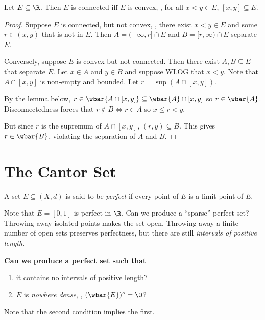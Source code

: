 \begin{theorem}
    Let $E \subseteq \R$.
    Then $E$ is connected iff $E$ is convex, \ie, for all $x < y \in E$,
    $[x, y] \subseteq E$.
\end{theorem}
\begin{proof}
    Suppose $E$ is connected, but not convex, \ie, there exist $x < y \in E$
    and some $r \in (x, y)$ that is not in $E$.
    Then $A = (-\infty, r] \cap E$ and $B = [r, \infty) \cap E$ separate
    $E$.

    Conversely, suppose $E$ is convex but not connected.
    Then there exist $A, B \subseteq E$ that separate $E$.
    Let $x \in A$ and $y \in B$ and suppose WLOG that $x < y$.
    Note that $A \cap [x, y]$ is non-empty and bounded.
    Let $r = \sup(A \cap [x, y])$.

    By the lemma below, $r \in \wbar{A \cap [x, y]} \subseteq \wbar{A}
    \cap [x, y]$ so $r \in \wbar{A}$.
    Disconnectedness forces that $r \notin B \iff r \in A$ so $x \le r < y$.

    But since $r$ is the supremum of $A \cap [x, y]$, $(r, y) \subseteq B$.
    This gives $r \in \wbar{B}$, violating the separation of $A$ and $B$.
\end{proof}

\section{The Cantor Set} \label{sec:cantor_set}
\begin{definition} \label{def:perfect_set}
    A set $E \subseteq (X, d)$ is said to be \emph{perfect} if every point
    of $E$ is a limit point of $E$.
\end{definition}
Note that $E = [0, 1]$ is perfect in $\R$.
Can we produce a ``sparse'' perfect set?
Throwing away isolated points makes the set open.
Throwing away a finite number of open sets preserves perfectness, but there
are still \emph{intervals of positive length}.

\textbf{Can we produce a perfect set such that}
\begin{enumerate}
    \item it contains no intervals of positive length?
    \item $E$ is \emph{nowhere dense}, \ie, $(\wbar{E})^\circ = \O$?
\end{enumerate}
Note that the second condition implies the first.
